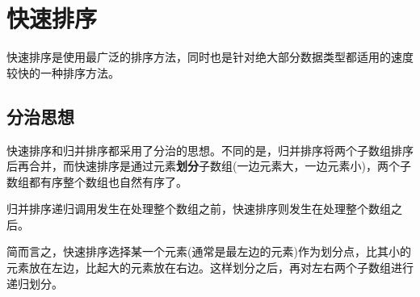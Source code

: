 \section{快速排序}

快速排序是使用最广泛的排序方法，同时也是针对绝大部分数据类型都适用的速度较快的一种排序方法。

\subsection{分治思想}

快速排序和归并排序都采用了分治的思想。不同的是，归并排序将两个子数组排序后再合并，而快速排序是通过元素\textbf{划分}子数组(一边元素大，一边元素小)，两个子数组都有序整个数组也自然有序了。

归并排序递归调用发生在处理整个数组之前，快速排序则发生在处理整个数组之后。

简而言之，快速排序选择某一个元素(通常是最左边的元素)作为划分点，比其小的元素放在左边，比起大的元素放在右边。这样划分之后，再对左右两个子数组进行递归划分。

